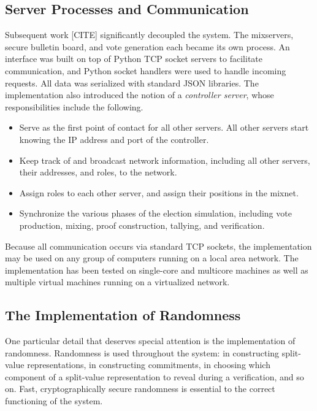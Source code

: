 \subsection{Server Processes and Communication}

Subsequent work [CITE] significantly decoupled the system. The mixservers, secure bulletin board, and vote generation each became its own process. An interface was built on top of Python TCP socket servers to facilitate communication, and Python socket handlers were used to handle incoming requests. All data was serialized with standard JSON libraries. The implementation also introduced the notion of a \emph{controller server}, whose responsibilities include the following.

\begin{itemize}
\item Serve as the first point of contact for all other servers. All other servers start knowing the IP address and port of the controller.
\item Keep track of and broadcast network information, including all other servers, their addresses, and roles, to the network.
\item Assign roles to each other server, and assign their positions in the mixnet.
\item Synchronize the various phases of the election simulation, including vote production, mixing, proof construction, tallying, and verification.
\end{itemize}

Because all communication occurs via standard TCP sockets, the implementation may be used on any group of computers running on a local area network. The implementation has been tested on single-core and multicore machines as well as multiple virtual machines running on a virtualized network.

\subsection{The Implementation of Randomness}

One particular detail that deserves special attention is the implementation of randomness. Randomness is used throughout the system: in constructing split-value representations, in constructing commitments, in choosing which component of a split-value representation to reveal during a verification, and so on. Fast, cryptographically secure randomness is essential to the correct functioning of the system.

